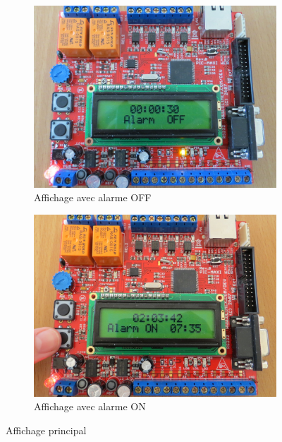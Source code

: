 \documentclass[12pt,a4paper]{article}
\begin{document}
\begin{figure}[!h]
        \centering
        \begin{subfigure}[b]{0.48\textwidth}
                \includegraphics[width=\textwidth]{photos/IMG_2152.JPG}
                \caption{Affichage avec alarme OFF}
                \label{fig:alarmeoff}
        \end{subfigure}
        \begin{subfigure}[b]{0.48\textwidth}
                \includegraphics[width=\textwidth]{photos/IMG_2158.JPG}
                \caption{Affichage avec alarme ON}
                \label{fig:alarmeon}
        \end{subfigure}
        \caption{Affichage principal}
        \label{fig:réveil}
\end{figure}
\end{document}
